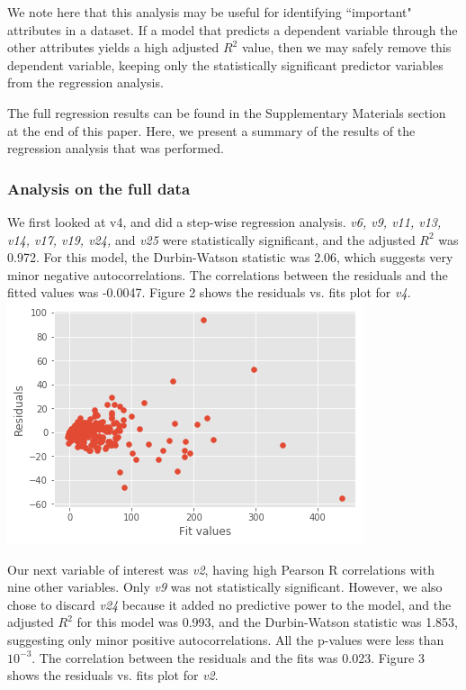 \documentclass[smallextended]{svjour3}
\begin{document}
	We note here that this analysis may be useful for identifying ``important" attributes in a dataset. If a model that predicts a dependent variable through the other attributes yields a high adjusted $R^2$ value, then we may safely remove this dependent variable, keeping only the statistically significant predictor variables from the regression analysis.
	
	The full regression results can be found in the Supplementary Materials section at the end of this paper. Here, we present a summary of the results of the regression analysis that was performed.
	
	\subsubsection{Analysis on the full data}
	We first looked at v4, and did a step-wise regression analysis. \textit{v6, v9, v11, v13, v14, v17, v19, v24,} and \textit{v25} were statistically significant, and the adjusted $R^2$ was 0.972. For this model, the Durbin-Watson statistic was 2.06, which suggests very minor negative autocorrelations. The correlations between the residuals and the fitted values was -0.0047. Figure 2 shows the residuals vs. fits plot for \textit{v4}.\\
	
	\includegraphics[scale=0.5]{fig2.png}
	\begingroup
	\endgroup
	\hfill\break
	
	Our next variable of interest was \textit{v2}, having high Pearson R correlations with nine other variables. Only \textit{v9} was not statistically significant. However, we also chose to discard \textit{v24} because it added no predictive power to the model, and the adjusted $R^2$ for this model was 0.993, and the Durbin-Watson statistic was 1.853, suggesting only minor positive autocorrelations. All the p-values were less than $10^{-3}$. The correlation between the residuals and the fits was 0.023. Figure 3 shows the residuals vs. fits plot for \textit{v2}.
	
\end{document}
